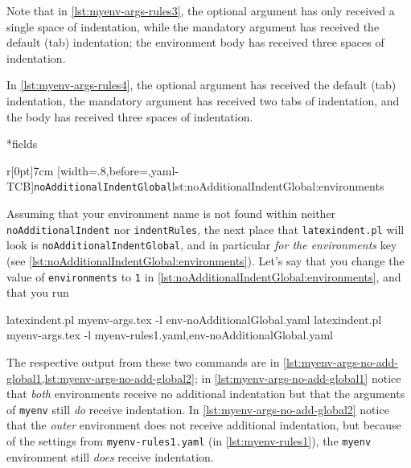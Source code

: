 	Note that in \cref{lst:myenv-args-rules3}, the optional argument has only received a single space of indentation, while the mandatory argument
	has received the default (tab) indentation; the environment body has received three spaces of indentation.

	In \cref{lst:myenv-args-rules4}, the optional argument has received the default (tab) indentation, the mandatory argument has received two tabs
	of indentation, and the body has received three spaces of indentation.

*{fields}
	\begin{wrapfigure}[6]{r}[0pt]{7cm}
		[width=.8\linewidth,before=\centering,yaml-TCB]{\texttt{noAdditionalIndentGlobal}}{lst:noAdditionalIndentGlobal:environments}
	\end{wrapfigure}
	Assuming that your environment name is not found within neither \texttt{noAdditionalIndent} nor \texttt{indentRules}, the next
	place that \texttt{latexindent.pl} will look is \texttt{noAdditionalIndentGlobal}, and in particular \emph{for the environments} key
	(see \cref{lst:noAdditionalIndentGlobal:environments}). Let's say that you change
	the value of \texttt{environments} to \texttt{1} in \cref{lst:noAdditionalIndentGlobal:environments}, and that you run

	\begin{widepage}
		\begin{commandshell}
latexindent.pl myenv-args.tex -l env-noAdditionalGlobal.yaml
latexindent.pl myenv-args.tex -l myenv-rules1.yaml,env-noAdditionalGlobal.yaml
\end{commandshell}
	\end{widepage}

	The respective output from these two commands are in \cref{lst:myenv-args-no-add-global1,lst:myenv-args-no-add-global2}; in \cref{lst:myenv-args-no-add-global1} notice that \emph{both}
	environments receive no additional indentation but that the arguments of \texttt{myenv} still \emph{do} receive indentation. In \cref{lst:myenv-args-no-add-global2}
	notice that the \emph{outer} environment does not receive additional indentation, but because of the settings from \texttt{myenv-rules1.yaml} (in \vref{lst:myenv-rules1}), the \texttt{myenv}
	environment still \emph{does} receive indentation.

	\begin{minipage}{.45\textwidth}
	\end{minipage}
	\hfill
	\begin{minipage}{.45\textwidth}
	\end{minipage}

